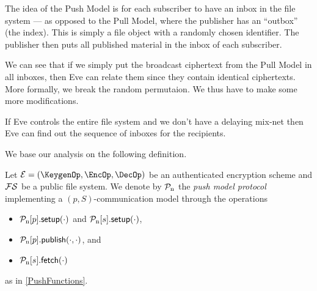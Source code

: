 The idea of the Push Model is for each subscriber to have an inbox in the file 
system --- as opposed to the Pull Model, where the publisher has an 
\enquote{outbox} (the index).
This is simply a file object with a randomly chosen identifier.
The publisher then puts all published material in the inbox of each subscriber.

We can see that if we simply put the broadcast ciphertext from the Pull Model 
in all inboxes, then Eve can relate them since they contain identical 
ciphertexts.
More formally, we break the random permutaion.
We thus have to make some more modifications.

If Eve controls the entire file system and we don't have a delaying mix-net 
then Eve can find out the sequence of inboxes for the recipients.

We base our analysis on the following definition.

\begin{definition}\label{PushModel}
  Let \(\mathcal{E} = (\KeygenOp, \EncOp, \DecOp)\) be an authenticated 
  encryption scheme and \(\operatorname{\mathcal{FS}}\) be a public file system.
  We denote by \(\operatorname{\mathcal{P}_n}\) the \emph{push model protocol} implementing a \((p, 
    S)\)-communication model through the operations
  \begin{itemize}
    \item \(\pnsetup{p}[\cdot]\) and \(\pnsetup{s}[\cdot]\),
    \item \(\pnpub{p}[\cdot][\cdot]\), and
    \item \(\pnget{s}[\cdot]\)
  \end{itemize}
  as in \cref{PushFunctions}.
\end{definition}

